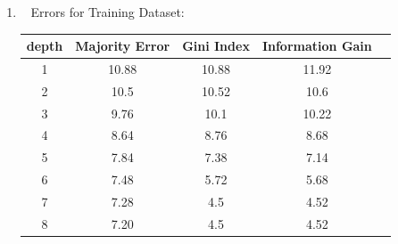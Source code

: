 \documentclass[12pt, fullpage,letterpaper]{article}
\begin{document}
\begin{enumerate}
\begin{enumerate}
	
	\item~
	\newline
\newline
\newline
\newline
\newline
\newline
\newline
\newline
\newline
\newline
\newline
\newline
\newline
\newline
\newline
\newline
\newline
\newline
\newline
\newline
\newline
\newline
\newline
\newline
\newline
\newline
\newline
\newline
\newline
\newline
\newline
\newline
\newline
\newline
	\newline Errors for Training Dataset:
	\begin{table}[h]
	\centering
	\begin{tabular}{cccc|c}
		depth & Majority Error & Gini Index & Information Gain\\ 
		\hline\hline
		1 & 10.88 & 10.88 & 11.92 \\ \hline
		2 & 10.5 & 10.52 & 10.6 \\ \hline
		3 & 9.76 & 10.1 & 10.22 \\ \hline
		4 & 8.64 & 8.76 & 8.68 \\ \hline
		5 & 7.84 & 7.38 & 7.14\\ \hline
		6 & 7.48 & 5.72 & 5.68\\ \hline
		7 & 7.28 & 4.5 & 4.52 \\ \hline
		8 & 7.20 & 4.5 & 4.52 \\ \hline

\end{tabular}
\end{table}
\end{enumerate}
\end{enumerate}
\end{document}
